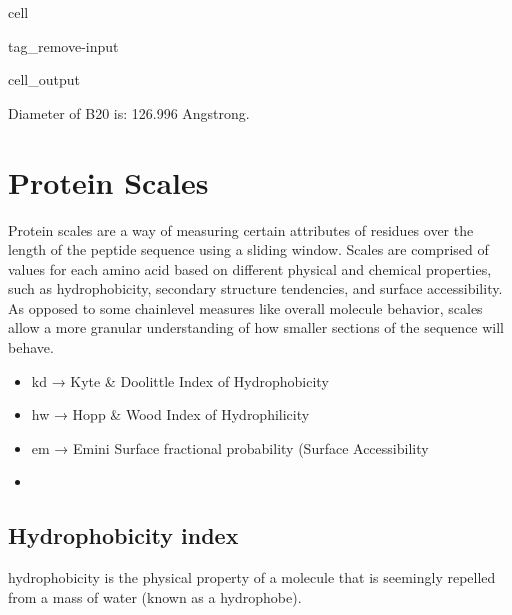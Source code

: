 \documentclass[letterpaper,10pt,english]{jupyterBook}
\begin{document}
\begin{sphinxuseclass}{cell}
\begin{sphinxuseclass}{tag_remove-input}\begin{sphinxVerbatimOutput}

\begin{sphinxuseclass}{cell_output}
\begin{sphinxVerbatim}[commandchars=\\\{\}]
\PYGZsh{} Diameter of B20 is: \PYGZhy{}\PYGZhy{}\PYGZhy{}\PYGZhy{}\PYGZhy{}\PYGZhy{}\PYGZhy{}\PYGZhy{}\PYGZhy{}\PYGZhy{}\PYGZhy{}\PYGZhy{}\PYGZhy{}\PYGZhy{}\PYGZhy{}\PYGZhy{}\PYGZhy{}\PYGZhy{}\PYGZhy{}\PYGZhy{}\PYGZhy{}\PYGZhy{}\PYGZhy{}126.996 Angstrong.
\end{sphinxVerbatim}

\end{sphinxuseclass}\end{sphinxVerbatimOutput}

\end{sphinxuseclass}
\end{sphinxuseclass}

\section{Protein Scales}
\label{\detokenize{ipynb/chapter1:protein-scales}}
\sphinxAtStartPar
Protein scales are a way of measuring certain attributes of residues over the length of the peptide sequence using a sliding window. Scales are comprised of values for each amino acid based on different physical and chemical properties, such as hydrophobicity, secondary structure tendencies, and surface accessibility. As opposed to some chain\sphinxhyphen{}level measures like overall molecule behavior, scales allow a more granular understanding of how smaller sections of the sequence will behave.
\begin{itemize}
\item {} 
\sphinxAtStartPar
kd → Kyte \& Doolittle Index of Hydrophobicity

\item {} 
\sphinxAtStartPar
hw → Hopp \& Wood Index of Hydrophilicity

\item {} 
\sphinxAtStartPar
em → Emini Surface fractional probability (Surface Accessibility

\item {} 
\end{itemize}


\subsection{Hydrophobicity index}
\label{\detokenize{ipynb/chapter1:hydrophobicity-index}}
\sphinxAtStartPar
hydrophobicity is the physical property of a molecule that is seemingly repelled from a mass of water (known as a hydrophobe).
\end{document}
